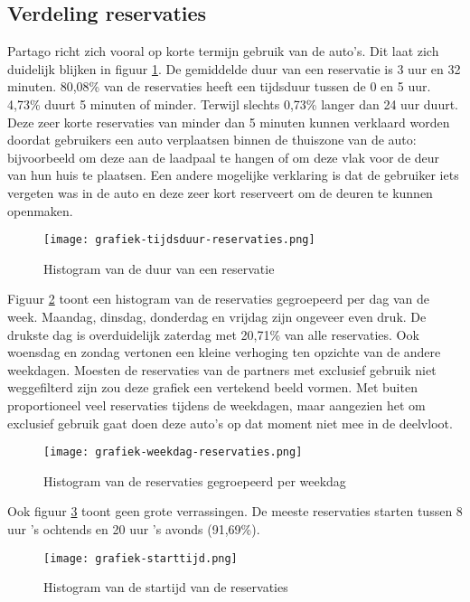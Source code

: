 \subsection{Verdeling reservaties}
Partago richt zich vooral op korte termijn gebruik van de auto's. Dit laat zich duidelijk blijken in figuur \ref{grafiek:gebruiksduur}.
De gemiddelde duur van een reservatie is 3 uur en 32 minuten. 80,08\% van de reservaties heeft een tijdsduur tussen de 0 en 5 uur. 4,73\% duurt 5 minuten of minder. Terwijl slechts 0,73\% langer dan 24 uur duurt. Deze zeer korte reservaties van minder dan 5 minuten kunnen verklaard worden doordat gebruikers een auto verplaatsen binnen de thuiszone van de auto: bijvoorbeeld om deze aan de laadpaal te hangen of om deze vlak voor de deur van hun huis te plaatsen. Een andere mogelijke verklaring is dat de gebruiker iets vergeten was in de auto en deze zeer kort reserveert om de deuren te kunnen openmaken.  
\begin{figure}[p]
	\texttt{[image: grafiek-tijdsduur-reservaties.png]}
	\caption[Histogram van de duur van een reservatie]{Histogram van de duur van een reservatie}
	\label{grafiek:gebruiksduur}
\end{figure}
Figuur \ref{grafiek:weekdag} toont een histogram van de reservaties gegroepeerd per dag van de week. Maandag, dinsdag, donderdag en vrijdag zijn ongeveer even druk. De drukste dag is overduidelijk zaterdag met 20,71\% van alle reservaties. Ook woensdag en zondag vertonen een kleine verhoging ten opzichte van de andere weekdagen. Moesten de reservaties van de partners met exclusief gebruik niet weggefilterd zijn zou deze grafiek een vertekend beeld vormen. Met buiten proportioneel veel reservaties tijdens de weekdagen, maar aangezien het om exclusief gebruik gaat doen deze auto's op dat moment niet mee in de deelvloot. 
\begin{figure}[p]
	\texttt{[image: grafiek-weekdag-reservaties.png]}
	\caption[Histogram van de reservaties gegroepeerd per weekdag]{Histogram van de reservaties gegroepeerd per weekdag}
	\label{grafiek:weekdag}
\end{figure}
Ook figuur \ref{grafiek:starttijd} toont geen grote verrassingen. De meeste reservaties starten tussen 8 uur 's ochtends en 20 uur 's avonds (91,69\%).
\begin{figure}[p]
	\texttt{[image: grafiek-starttijd.png]}
	\caption[Histogram van de startijd van de reservaties]{Histogram van de startijd van de reservaties}
	\label{grafiek:starttijd}
\end{figure}


